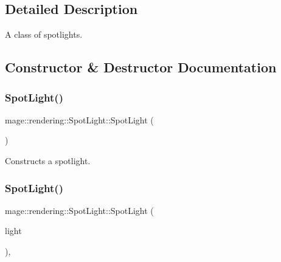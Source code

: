 \subsection{Detailed Description}
A class of spotlights. 

\subsection{Constructor \& Destructor Documentation}
\hypertarget{classmage_1_1rendering_1_1_spot_light_abc287714a0bb8f4fab5960b7bcbb4316}{}\label{classmage_1_1rendering_1_1_spot_light_abc287714a0bb8f4fab5960b7bcbb4316} 
\subsubsection{\texorpdfstring{Spot\+Light()}{SpotLight()}\hspace{0.1cm}{\footnotesize\ttfamily [1/3]}}
{\footnotesize\ttfamily mage\+::rendering\+::\+Spot\+Light\+::\+Spot\+Light (\begin{DoxyParamCaption}{ }\end{DoxyParamCaption})\hspace{0.3cm}{\ttfamily [noexcept]}}

Constructs a spotlight. \hypertarget{classmage_1_1rendering_1_1_spot_light_a3e94a01b574efb8af5540e24d7af75c6}{}\label{classmage_1_1rendering_1_1_spot_light_a3e94a01b574efb8af5540e24d7af75c6} 
\subsubsection{\texorpdfstring{Spot\+Light()}{SpotLight()}\hspace{0.1cm}{\footnotesize\ttfamily [2/3]}}
{\footnotesize\ttfamily mage\+::rendering\+::\+Spot\+Light\+::\+Spot\+Light (\begin{DoxyParamCaption}\item[{const \hyperlink{classmage_1_1rendering_1_1_spot_light}{Spot\+Light} \&}]{light }\end{DoxyParamCaption})\hspace{0.3cm}{\ttfamily [default]}, {\ttfamily [noexcept]}}

